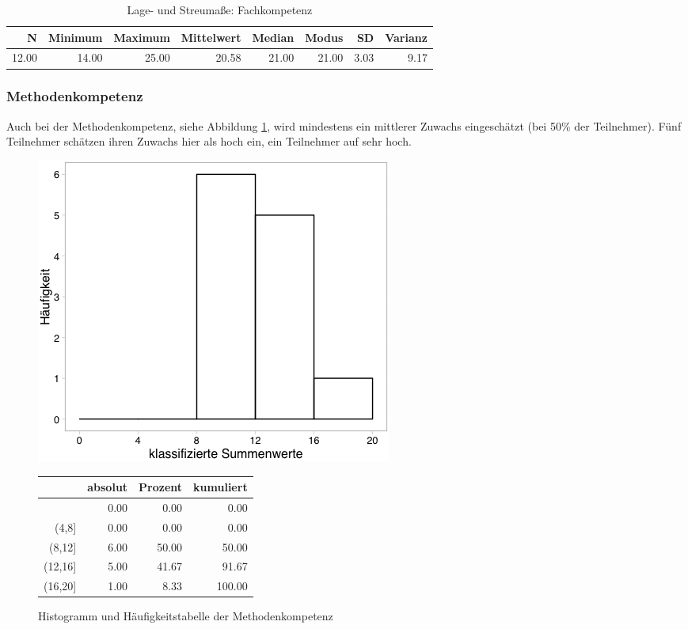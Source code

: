 \documentclass[12pt,smallheadings, bibliography=totoc]{scrartcl}
\begin{document}
\begin{table}[H]
\centering
\caption{Lage- und Streumaße: Fachkompetenz}
\label{tab:lFK}
\begin{tabular}{rrrrrrrr}
  \hline
  N & Minimum & Maximum & Mittelwert & Median & Modus & SD & Varianz \\
  \hline
 12.00 & 14.00 & 25.00 & 20.58 & 21.00 & 21.00 & 3.03 & 9.17 \\
   \hline
\end{tabular}
\end{table}

\subsubsection{Methodenkompetenz}\label{methodenkompetenz}

Auch bei der Methodenkompetenz, siehe Abbildung \ref{fig:MK}, wird
mindestens ein mittlerer Zuwachs eingeschätzt (bei 50\% der Teilnehmer).
Fünf Teilnehmer schätzen ihren Zuwachs hier als hoch ein, ein Teilnehmer
auf sehr hoch.

\begin{figure}[H]
\begin{minipage}{.4\linewidth}
\includegraphics[width=0.8\linewidth]{Anhang/MKHistnn.png}


\end{minipage}
\begin{minipage}{.4\linewidth}
\centering
\raisebox{\depth}
{\begin{tabular}{rrrr}
  \hline
 & absolut & Prozent & kumuliert \\ 
  \hline
[4] & 0.00 & 0.00 & 0.00 \\ 
  (4,8] & 0.00 & 0.00 & 0.00 \\ 
  (8,12] & 6.00 & 50.00 & 50.00 \\ 
  (12,16] & 5.00 & 41.67 & 91.67 \\ 
  (16,20] & 1.00 & 8.33 & 100.00 \\ 
   \hline
\end{tabular}

}
\label{tab:defis}
\end{minipage}
\caption{Histogramm und Häufigkeitstabelle der Methodenkompetenz}
\label{fig:MK}
\end{figure}
\end{document}

